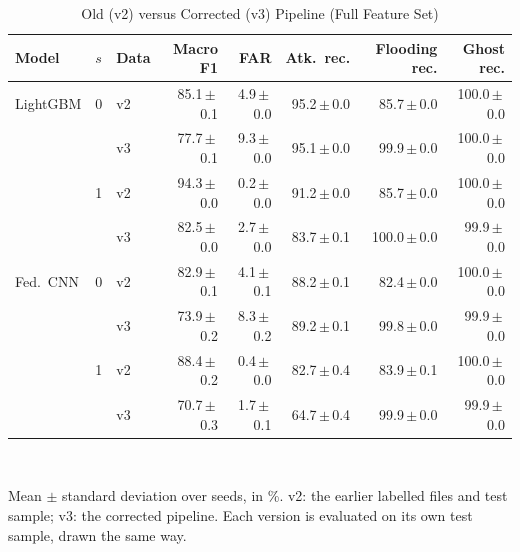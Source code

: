 \begin{table}[t]
\centering
\scriptsize
\caption{Old (v2) versus Corrected (v3) Pipeline (Full Feature Set)}
\label{tab:v2v3}
\setlength{\tabcolsep}{3pt}
\begin{tabular}{lllrrrrr}
\toprule
Model & $s$ & Data & Macro F1 & FAR & Atk.\ rec. & Flooding rec. & Ghost rec. \\
\midrule
LightGBM & 0 & v2 & 85.1{\,}$\pm${\,}0.1 & 4.9{\,}$\pm${\,}0.0 & 95.2{\,}$\pm${\,}0.0 & 85.7{\,}$\pm${\,}0.0 & 100.0{\,}$\pm${\,}0.0 \\
 &  & v3 & 77.7{\,}$\pm${\,}0.1 & 9.3{\,}$\pm${\,}0.0 & 95.1{\,}$\pm${\,}0.0 & 99.9{\,}$\pm${\,}0.0 & 100.0{\,}$\pm${\,}0.0 \\
 & 1 & v2 & 94.3{\,}$\pm${\,}0.0 & 0.2{\,}$\pm${\,}0.0 & 91.2{\,}$\pm${\,}0.0 & 85.7{\,}$\pm${\,}0.0 & 100.0{\,}$\pm${\,}0.0 \\
 &  & v3 & 82.5{\,}$\pm${\,}0.0 & 2.7{\,}$\pm${\,}0.0 & 83.7{\,}$\pm${\,}0.1 & 100.0{\,}$\pm${\,}0.0 & 99.9{\,}$\pm${\,}0.0 \\
\midrule
Fed.\ CNN & 0 & v2 & 82.9{\,}$\pm${\,}0.1 & 4.1{\,}$\pm${\,}0.1 & 88.2{\,}$\pm${\,}0.1 & 82.4{\,}$\pm${\,}0.0 & 100.0{\,}$\pm${\,}0.0 \\
 &  & v3 & 73.9{\,}$\pm${\,}0.2 & 8.3{\,}$\pm${\,}0.2 & 89.2{\,}$\pm${\,}0.1 & 99.8{\,}$\pm${\,}0.0 & 99.9{\,}$\pm${\,}0.0 \\
 & 1 & v2 & 88.4{\,}$\pm${\,}0.2 & 0.4{\,}$\pm${\,}0.0 & 82.7{\,}$\pm${\,}0.4 & 83.9{\,}$\pm${\,}0.1 & 100.0{\,}$\pm${\,}0.0 \\
 &  & v3 & 70.7{\,}$\pm${\,}0.3 & 1.7{\,}$\pm${\,}0.1 & 64.7{\,}$\pm${\,}0.4 & 99.9{\,}$\pm${\,}0.0 & 99.9{\,}$\pm${\,}0.0 \\
\bottomrule
\end{tabular}
\\[2pt]
\parbox{\linewidth}{\scriptsize Mean $\pm$ standard deviation over seeds, in \%. v2: the earlier labelled files and test sample; v3: the corrected pipeline. Each version is evaluated on its own test sample, drawn the same way.}
\end{table}

